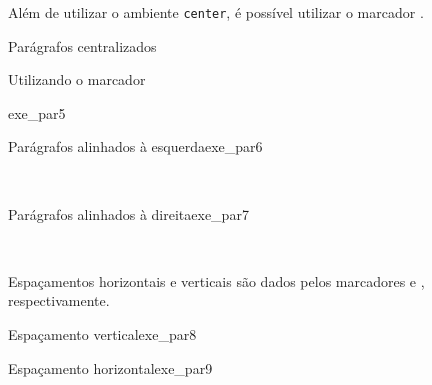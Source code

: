 Além de utilizar o ambiente \texttt{center}, é possível utilizar o marcador \texttt{\centering}.

\begin{texexptitled}[breakable,enhanced,middle=2mm]{Parágrafos centralizados \par Utilizando o marcador \texttt{\centering}}{exe_par5}
\centering
\lipsumsentence[13-14] \\ 
\lipsumsentence[15-16]
\end{texexptitled}

\begin{texexptitled}[breakable,enhanced,middle=2mm]{Parágrafos alinhados à esquerda}{exe_par6}
\begin{flushleft}
\lipsumsentence[17-18] \\ 
\lipsumsentence[19-20]
\end{flushleft}
\end{texexptitled}

\begin{texexptitled}[breakable,enhanced,middle=2mm]{Parágrafos alinhados à direita}{exe_par7}
\begin{flushright}
\lipsumsentence[21-22] \\ 
\lipsumsentence[23-24]
\end{flushright}
\end{texexptitled}

Espaçamentos horizontais e verticais são dados pelos marcadores \texttt{\vspace{}} e \texttt{\hspace{}}, respectivamente.


\begin{texexptitled}[breakable,enhanced,middle=2mm]{Espaçamento vertical}{exe_par8}
\lipsumsentence[21-22] 
\vspace{1cm}
\lipsumsentence[23-27]
\end{texexptitled}

\begin{texexptitled}[breakable,enhanced,middle=2mm]{Espaçamento horizontal}{exe_par9}
\hspace{2cm}\lipsumsentence[28-29] \\ 
\lipsumsentence[30-31]
\end{texexptitled}


